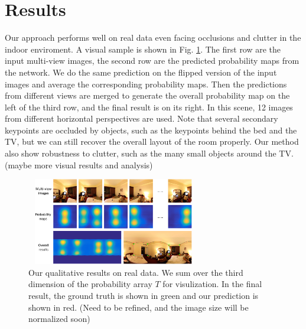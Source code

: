 

\section{Results}
Our approach performs well on real data even facing occlusions and clutter in the indoor enviroment. A visual sample is shown in Fig. \ref{fig:results1}. The first row are the input multi-view images, the second row are the predicted probability maps from the network. We do the same prediction on the flipped version of the input images and average the corresponding probability maps. Then the predictions from different views are merged to generate the overall probability map on the left of the third row, and the final result is on its right. In this scene, 12 images from different horizontal perspectives are used. Note that several secondary keypoints are occluded by objects, such as the keypoints behind the bed and the TV, but we can still recover the overall layout of the room properly. Our method also show robustness to clutter, such as the many small objects around the TV. (maybe more visual results and analysis)

\begin{figure}
	\includegraphics[height=1.5in, width=3in]{figs/results1.png}
	\caption{Our qualitative results on real data. We sum over the third dimension of the probability array $T$ for visulization. In the final result, the ground truth is shown in green and our prediction is shown in red. (Need to be refined, and the image size will be normalized soon)}
	\label{fig:results1}
\end{figure}

